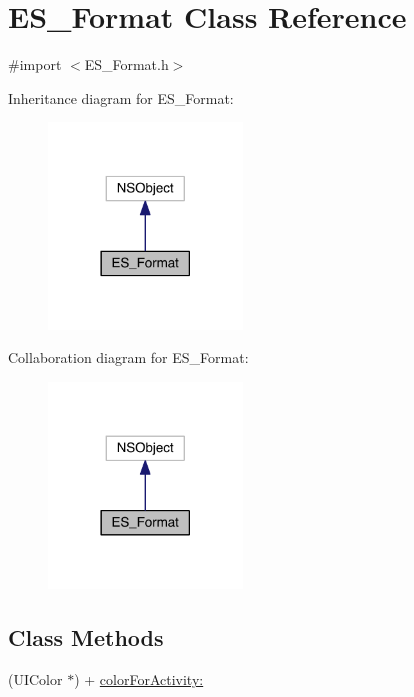 \hypertarget{interface_e_s___format}{\section{E\+S\+\_\+\+Format Class Reference}
\label{interface_e_s___format}
}


{\ttfamily \#import $<$E\+S\+\_\+\+Format.\+h$>$}



Inheritance diagram for E\+S\+\_\+\+Format\+:\nopagebreak
\begin{figure}[H]
\begin{center}
\leavevmode
\includegraphics[width=146pt]{d9/d10/interface_e_s___format__inherit__graph}
\end{center}
\end{figure}


Collaboration diagram for E\+S\+\_\+\+Format\+:\nopagebreak
\begin{figure}[H]
\begin{center}
\leavevmode
\includegraphics[width=146pt]{d2/d69/interface_e_s___format__coll__graph}
\end{center}
\end{figure}
\subsection*{Class Methods}
\begin{DoxyCompactItemize}
\item 
(U\+I\+Color $\ast$) + \hyperlink{interface_e_s___format_a066ec3c672073ee753f089b20e466c83}{color\+For\+Activity\+:}
\end{DoxyCompactItemize}


